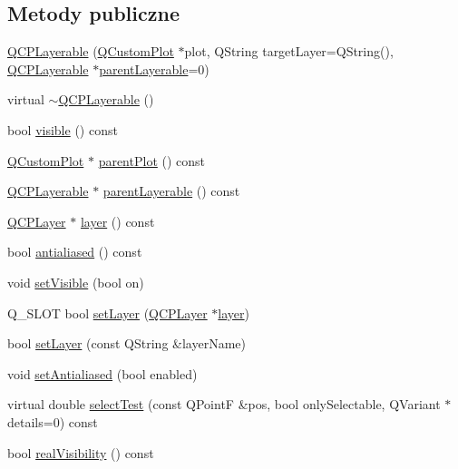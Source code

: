 \subsection*{Metody publiczne}
\begin{DoxyCompactItemize}
\item 
\hyperlink{class_q_c_p_layerable_a74c0fa237f29bf0e49565013fc5d1ec0}{Q\+C\+P\+Layerable} (\hyperlink{class_q_custom_plot}{Q\+Custom\+Plot} $\ast$plot, Q\+String target\+Layer=Q\+String(), \hyperlink{class_q_c_p_layerable}{Q\+C\+P\+Layerable} $\ast$\hyperlink{class_q_c_p_layerable_a98d79f5b716d45eac4347befe546d0ec}{parent\+Layerable}=0)
\item 
virtual \hyperlink{class_q_c_p_layerable_a4231cf5b3601d6d3a5781283e7a9735b}{$\sim$\+Q\+C\+P\+Layerable} ()
\item 
bool \hyperlink{class_q_c_p_layerable_a10a3cc92e0fa63e4a929e61d34e275a7}{visible} () const 
\item 
\hyperlink{class_q_custom_plot}{Q\+Custom\+Plot} $\ast$ \hyperlink{class_q_c_p_layerable_ab7e0e94461566093d36ffc0f5312b109}{parent\+Plot} () const 
\item 
\hyperlink{class_q_c_p_layerable}{Q\+C\+P\+Layerable} $\ast$ \hyperlink{class_q_c_p_layerable_a98d79f5b716d45eac4347befe546d0ec}{parent\+Layerable} () const 
\item 
\hyperlink{class_q_c_p_layer}{Q\+C\+P\+Layer} $\ast$ \hyperlink{class_q_c_p_layerable_aea67e8c19145e70d68c286a36f6b8300}{layer} () const 
\item 
bool \hyperlink{class_q_c_p_layerable_aef5cb4aa899ed9dc9384fd614560291e}{antialiased} () const 
\item 
void \hyperlink{class_q_c_p_layerable_a3bed99ddc396b48ce3ebfdc0418744f8}{set\+Visible} (bool on)
\item 
Q\+\_\+\+S\+L\+OT bool \hyperlink{class_q_c_p_layerable_ab0d0da6d2de45a118886d2c8e16d5a54}{set\+Layer} (\hyperlink{class_q_c_p_layer}{Q\+C\+P\+Layer} $\ast$\hyperlink{class_q_c_p_layerable_aea67e8c19145e70d68c286a36f6b8300}{layer})
\item 
bool \hyperlink{class_q_c_p_layerable_ab25a0e7b897993b44447caee0f142083}{set\+Layer} (const Q\+String \&layer\+Name)
\item 
void \hyperlink{class_q_c_p_layerable_a4fd43e89be4a553ead41652565ff0581}{set\+Antialiased} (bool enabled)
\item 
virtual double \hyperlink{class_q_c_p_layerable_a4001c4d0dfec55598efa4d531f2179a9}{select\+Test} (const Q\+PointF \&pos, bool only\+Selectable, Q\+Variant $\ast$details=0) const 
\item 
bool \hyperlink{class_q_c_p_layerable_a30809f7455e9794bca7b6c737622fa63}{real\+Visibility} () const 
\end{DoxyCompactItemize}
